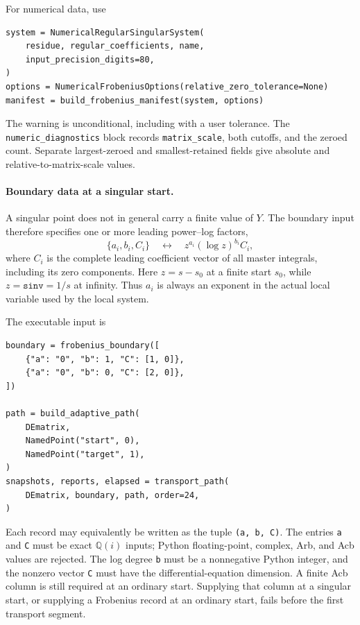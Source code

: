 \documentclass[11pt]{article}
\begin{document}
For numerical data, use
\begin{verbatim}
system = NumericalRegularSingularSystem(
    residue, regular_coefficients, name,
    input_precision_digits=80,
)
options = NumericalFrobeniusOptions(relative_zero_tolerance=None)
manifest = build_frobenius_manifest(system, options)
\end{verbatim}
The warning is unconditional, including with a user tolerance.  The
\texttt{numeric\_diagnostics} block records \texttt{matrix\_scale}, both cutoffs, and the
zeroed count.  Separate largest-zeroed and smallest-retained fields give absolute and
relative-to-matrix-scale values.

\paragraph{Boundary data at a singular start.}
\label{sec:frobenius-boundary}

A singular point does not in general carry a finite value of $Y$.  The boundary input
therefore specifies one or more leading power--log factors,
\begin{equation}
  \bigl\{a_i,b_i,C_i\bigr\}
  \quad\longleftrightarrow\quad
  z^{a_i}(\log z)^{b_i}C_i,
  \label{eq:frobenius-boundary-record}
\end{equation}
where $C_i$ is the complete leading coefficient vector of all master integrals, including
its zero components.  Here $z=s-s_0$ at a finite start $s_0$, while $z=\texttt{sinv}=1/s$
at infinity.  Thus $a_i$ is always an exponent in the actual local variable used by the
local system.

The executable input is
\begin{verbatim}
boundary = frobenius_boundary([
    {"a": "0", "b": 1, "C": [1, 0]},
    {"a": "0", "b": 0, "C": [2, 0]},
])

path = build_adaptive_path(
    DEmatrix,
    NamedPoint("start", 0),
    NamedPoint("target", 1),
)
snapshots, reports, elapsed = transport_path(
    DEmatrix, boundary, path, order=24,
)
\end{verbatim}
Each record may equivalently be written as the tuple \texttt{(a, b, C)}.  The entries
\texttt{a} and \texttt{C} must be exact $\mathbb Q(i)$ inputs; Python floating-point,
complex, Arb, and Acb values are rejected.  The log degree \texttt{b} must be a nonnegative
Python integer, and the nonzero vector \texttt{C} must have the differential-equation
dimension.  A finite Acb column is still required at an ordinary start.  Supplying that
column at a singular start, or supplying a Frobenius record at an ordinary start, fails
before the first transport segment.
\end{document}
